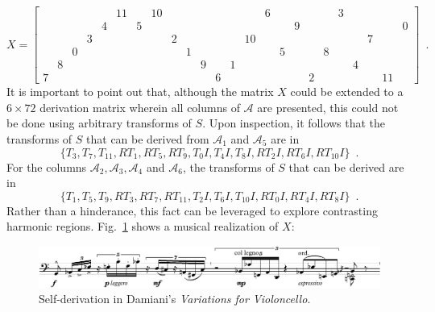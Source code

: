 \begin{example}
    \begin{equation}
        X = \left[
        \begin{array}{cccccccccccc|cccccccccccc}
            &&&&& 11 && 10 &&&&&&& 6 &&&&& 3 &&&& \\
            &&&& 4 && 5 &&&&&&&&&& 9 &&&&&&& 0 \\
            &&& 3 &&&&& 2 &&&&& 10 &&&&&&&& 7 && \\
            && 0 &&&&&&& 1 &&&&&& 5 &&& 8 &&&&& \\
            & 8 &&&&&&&&& 9 && 1 &&&&&&&& 4 &&& \\
            7 &&&&&&&&&&& 6 &&&&&& 2 &&&&& 11 &
        \end{array}
        \right] \enspace.
    \end{equation}
    It is important to point out that, although the matrix $X$ could be extended to a $6 \times 72$ derivation matrix wherein all columns of $\mathcal{A}$ are presented, this could not be done using arbitrary transforms of $S$. Upon inspection, it follows that the transforms of $S$ that can be derived from $\mathcal{A}_1$ and $\mathcal{A}_5$ are in
    \begin{equation}
        \{ T_3, T_7, T_{11}, RT_1, RT_5, RT_9, T_0I, T_4I, T_8I, RT_2I, RT_6I, RT_{10}I \} \enspace.
    \end{equation}
    For the columns $\mathcal{A}_2, \mathcal{A}_3, \mathcal{A}_4$ and $\mathcal{A}_6$, the transforms of $S$ that can be derived are in
    \begin{equation}
        \{ T_1, T_5, T_9, RT_3, RT_7, RT_{11}, T_2I, T_6I, T_{10}I, RT_0I, RT_4I, RT_8I \} \enspace.
    \end{equation}
    Rather than a hinderance, this fact can be leveraged to explore contrasting harmonic regions. Fig.~\ref{fig:stingray} shows a musical realization of $X$:
    \begin{figure}[htbp]
        \centering
        \includegraphics[width=6.5in]{figures/stingray-example.pdf}
        \caption[Self-derivation in Damiani's \emph{Variations for Violoncello}.]{Self-derivation in Damiani's \emph{Variations for Violoncello}.}
        \label{fig:stingray}
    \end{figure}
\end{example}

